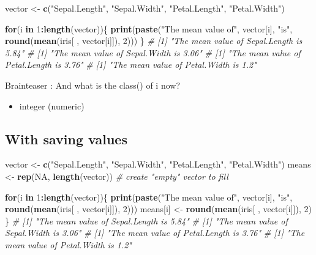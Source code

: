 \documentclass[
]{book}
\newenvironment{Shaded}{\begin{snugshade}}{\end{snugshade}}
\newcommand{\CommentTok}[1]{\textcolor[rgb]{0.56,0.35,0.01}{\textit{#1}}}
\newcommand{\ConstantTok}[1]{\textcolor[rgb]{0.56,0.35,0.01}{#1}}
\newcommand{\ControlFlowTok}[1]{\textcolor[rgb]{0.13,0.29,0.53}{\textbf{#1}}}
\newcommand{\DecValTok}[1]{\textcolor[rgb]{0.00,0.00,0.81}{#1}}
\newcommand{\FunctionTok}[1]{\textcolor[rgb]{0.13,0.29,0.53}{\textbf{#1}}}
\newcommand{\NormalTok}[1]{#1}
\newcommand{\OtherTok}[1]{\textcolor[rgb]{0.56,0.35,0.01}{#1}}
\newcommand{\SpecialCharTok}[1]{\textcolor[rgb]{0.81,0.36,0.00}{\textbf{#1}}}
\newcommand{\StringTok}[1]{\textcolor[rgb]{0.31,0.60,0.02}{#1}}
\providecommand{\tightlist}{%
  \setlength{\itemsep}{0pt}\setlength{\parskip}{0pt}}
\begin{document}
\begin{Shaded}
\begin{Highlighting}[]
\NormalTok{vector }\OtherTok{\textless{}{-}} \FunctionTok{c}\NormalTok{(}\StringTok{"Sepal.Length"}\NormalTok{, }\StringTok{"Sepal.Width"}\NormalTok{, }\StringTok{"Petal.Length"}\NormalTok{, }\StringTok{"Petal.Width"}\NormalTok{)}

\ControlFlowTok{for}\NormalTok{(i }\ControlFlowTok{in} \DecValTok{1}\SpecialCharTok{:}\FunctionTok{length}\NormalTok{(vector))\{}
  \FunctionTok{print}\NormalTok{(}\FunctionTok{paste}\NormalTok{(}\StringTok{"The mean value of"}\NormalTok{, vector[i], }\StringTok{"is"}\NormalTok{, }
              \FunctionTok{round}\NormalTok{(}\FunctionTok{mean}\NormalTok{(iris[ , vector[i]]), }\DecValTok{2}\NormalTok{)))}
\NormalTok{\}}
\CommentTok{\# [1] "The mean value of Sepal.Length is 5.84"}
\CommentTok{\# [1] "The mean value of Sepal.Width is 3.06"}
\CommentTok{\# [1] "The mean value of Petal.Length is 3.76"}
\CommentTok{\# [1] "The mean value of Petal.Width is 1.2"}
\end{Highlighting}
\end{Shaded}

Brainteaser : And what is the class() of i now?

\begin{itemize}
\tightlist
\item
  integer (numeric)
\end{itemize}

\subsection{With saving values}\label{with-saving-values}

\begin{Shaded}
\begin{Highlighting}[]
\NormalTok{vector }\OtherTok{\textless{}{-}} \FunctionTok{c}\NormalTok{(}\StringTok{"Sepal.Length"}\NormalTok{, }\StringTok{"Sepal.Width"}\NormalTok{, }\StringTok{"Petal.Length"}\NormalTok{, }\StringTok{"Petal.Width"}\NormalTok{)}
\NormalTok{means }\OtherTok{\textless{}{-}} \FunctionTok{rep}\NormalTok{(}\ConstantTok{NA}\NormalTok{, }\FunctionTok{length}\NormalTok{(vector)) }\CommentTok{\# create "empty" vector to fill}

\ControlFlowTok{for}\NormalTok{(i }\ControlFlowTok{in} \DecValTok{1}\SpecialCharTok{:}\FunctionTok{length}\NormalTok{(vector))\{}
  \FunctionTok{print}\NormalTok{(}\FunctionTok{paste}\NormalTok{(}\StringTok{"The mean value of"}\NormalTok{, vector[i], }\StringTok{"is"}\NormalTok{, }
              \FunctionTok{round}\NormalTok{(}\FunctionTok{mean}\NormalTok{(iris[ , vector[i]]), }\DecValTok{2}\NormalTok{)))}
\NormalTok{  means[i] }\OtherTok{\textless{}{-}} \FunctionTok{round}\NormalTok{(}\FunctionTok{mean}\NormalTok{(iris[ , vector[i]]), }\DecValTok{2}\NormalTok{)}
\NormalTok{\}}
\CommentTok{\# [1] "The mean value of Sepal.Length is 5.84"}
\CommentTok{\# [1] "The mean value of Sepal.Width is 3.06"}
\CommentTok{\# [1] "The mean value of Petal.Length is 3.76"}
\CommentTok{\# [1] "The mean value of Petal.Width is 1.2"}
\end{Highlighting}
\end{Shaded}
\end{document}
